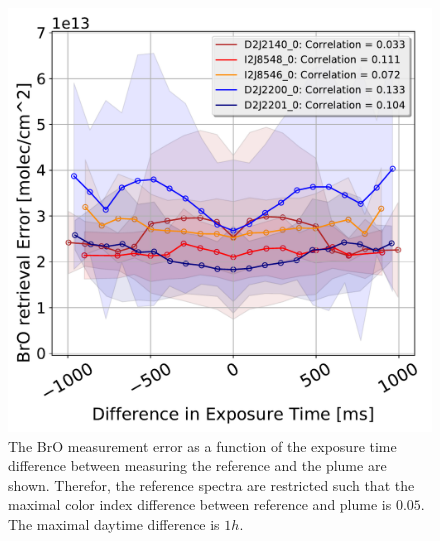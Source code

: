 \documentclass  [
  paper    = a4,
  BCOR     = 10mm,
  twoside,
  fontsize = 12pt,
  fleqn,
  toc      = bibnumbered,
  toc      = listofnumbered,
  numbers  = noendperiod,
  headings = normal,
  listof   = leveldown,
  version  = 3.03
]                                       {scrreprt}
\begin{document}
\begin{figure}[h]
	\centering
	\includegraphics[width=0.5\linewidth]{Bilder/BrOErr_OhnEVar/DiffExpTimewithoutOtherparamallInstruments}
	\caption{The BrO measurement error as a function of the exposure time difference between measuring the reference and the plume are shown. Therefor, the reference spectra are restricted such that the maximal color index difference between reference and plume is $0.05$. The maximal daytime difference is $1h$.}
	\label{fig:diffexptimewithoutotherparamallinstruments}
\end{figure}
\end{document}
